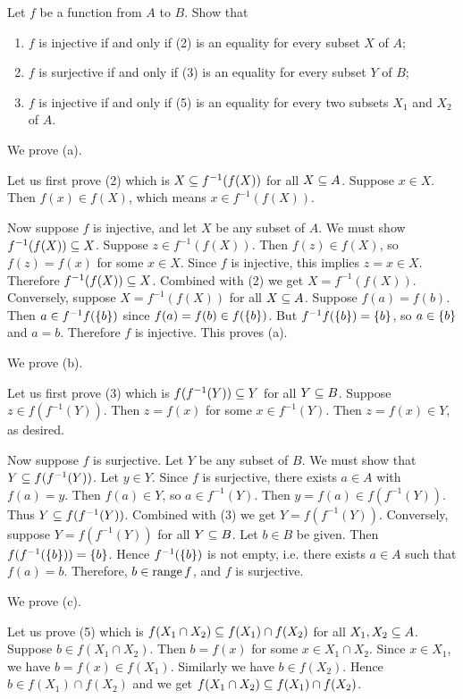 \documentclass{report}
\begin{document}
\begin{exercise}
Let $f$ be a function from $A$ to $B$. Show that
\begin{enumerate}[label=(\alph*)]
    \item $f$ is injective if and only if (2) is an equality for every subset $X$ of $A$;
    \item $f$ is surjective if and only if (3) is an equality for every subset $Y$ of $B$;
    \item $f$ is injective if and only if (5) is an equality for every two subsets $X_1$ and $X_2$ of $A$.
\end{enumerate}
\end{exercise}

\begin{solution}
We prove (a).

Let us first prove (2) which is $X\subseteq f^{-1}(f(X))$ for all $X\subseteq A$.
Suppose $x\in X$. Then $f(x)\in f(X)$,
which means $x\in f^{-1}(f(X))$.

Now suppose $f$ is injective, and let $X$ be any subset of $A$. We must show $f^{-1}(f(X)) \subseteq X$.
Suppose $z\in f^{-1}(f(X))$. Then $f(z)\in f(X)$, so $f(z)=f(x)$ for some $x\in X$.
Since $f$ is injective, this implies $z=x\in X$. Therefore $f^{-1}(f(X)) \subseteq X$. Combined with (2)
we get $X = f^{-1}(f(X))$.
Conversely, suppose $X = f^{-1}(f(X))$ for all $X\subseteq A$. Suppose $f(a)=f(b)$.
Then $a\in f^{-1}f(\left\{b\right\})$ since $f(a)=f(b)\in f(\left\{b\right\})$.
But $f^{-1}f(\left\{b\right\})=\left\{b\right\}$, so $a\in\left\{b\right\}$ and $a=b$.
Therefore $f$ is injective. This proves (a).

We prove (b).

Let us first prove (3) which is $f(f^{-1}(Y))\subseteq Y$ for all $Y\subseteq B$.
Suppose $z\in f(f^{-1}(Y))$. Then $z=f(x)$ for some $x\in f^{-1}(Y)$.
Then $z=f(x)\in Y$, as desired.

Now suppose $f$ is surjective. Let $Y$ be any subset of $B$.
We must show that $Y\subseteq f(f^{-1}(Y))$. Let $y\in Y$.
Since $f$ is surjective, there exists $a\in A$ with $f(a)=y$.
Then $f(a)\in Y$, so $a\in f^{-1}(Y)$. Then $y=f(a)\in f(f^{-1}(Y))$.
Thus $Y\subseteq f(f^{-1}(Y))$. Combined with (3) we get $Y= f(f^{-1}(Y))$.
Conversely, suppose $Y= f(f^{-1}(Y))$ for all $Y\subseteq B$.
Let $b\in B$ be given. Then $f(f^{-1}(\left\{b\right\}))=\left\{b\right\}$.
Hence $f^{-1}(\left\{b\right\})$ is not empty, i.e. there exists $a\in A$ such that $f(a)=b$.
Therefore, $b\in\operatorname{range} f$, and $f$ is surjective.

We prove (c).

Let us prove (5) which is $f(X_1\cap X_2)\subseteq f(X_1)\cap f(X_2)$ for all $X_1,X_2\subseteq A$.
Suppose $b\in f(X_1\cap X_2)$. Then $b=f(x)$ for some $x\in X_1\cap X_2$.
Since $x\in X_1$, we have $b=f(x)\in f(X_1)$. Similarly we have $b\in f(X_2)$.
Hence $b\in f(X_1)\cap f(X_2)$ and we get $f(X_1\cap X_2)\subseteq f(X_1)\cap f(X_2)$.


\end{solution}
\end{document}
